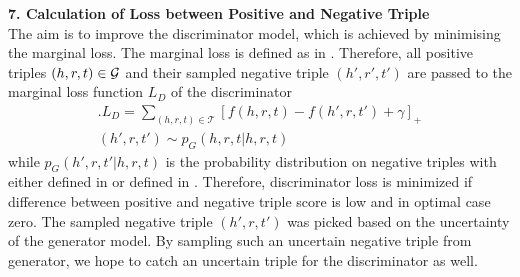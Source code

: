 \textbf{7. Calculation of Loss between Positive and Negative Triple}\\

The aim is to improve the discriminator model, which is achieved by minimising the marginal loss.
The marginal loss is defined as in .
Therefore, all positive triples $(h,r,t) \in \mathcal{G}$ and their sampled negative triple $(h',r', t')$  are passed to the marginal loss function $L_D$ of the discriminator
\begin{multline} \label{eq:marginalloss2}.
    L_D =\sum_{(h,r,t)\in\mathcal{T}}[f(h,r,t)-f(h',r,t')+\gamma]_+\\
    (h',r,t') \sim p_G(h,r,t|h,r,t) 
\end{multline}
while $p_G(h', r, t'|h, r, t)$ is the probability distribution on negative triples with either \usmax defined in  or \ussoftmax defined in .
Therefore, discriminator loss is minimized if difference between positive and negative triple score is low and in optimal case zero.
The sampled negative triple $(h',r,t')$ was picked based on the uncertainty of the generator model.
By sampling such an uncertain negative triple from generator, we hope to catch an uncertain triple for the discriminator as well.